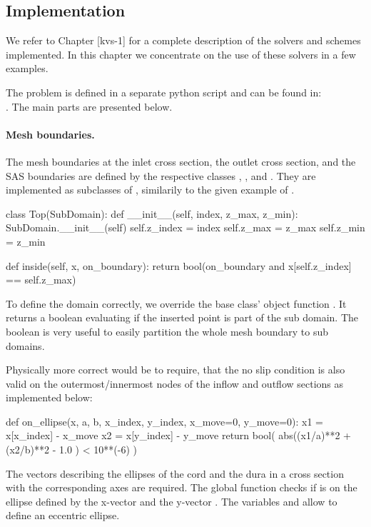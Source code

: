 \subsection{Implementation}
We refer to Chapter [kvs-1] for a complete description of the solvers
and schemes implemented. In this chapter we concentrate on the use of
these solvers in a few examples.  

The problem is defined in a separate python script and can be found in: \\
 . The main parts are presented below.

\paragraph{Mesh boundaries.}  The mesh boundaries at the inlet cross section, the outlet cross section, and the SAS boundaries are defined by the respective classes , , and . They are implemented as subclasses of , similarily to the given example of .
\begin{code}
class Top(SubDomain):	
	def __init__(self, index, z_max, z_min):
		SubDomain.__init__(self)
		self.z_index = index
		self.z_max = z_max
		self.z_min = z_min
	
	def inside(self, x, on_boundary):
		return bool(on_boundary and x[self.z_index] == self.z_max)
\end{code}
To define the domain correctly, we override the base class' object function . It returns a boolean evaluating if the inserted point  is part of the sub domain. The boolean  is very useful to easily partition the whole mesh boundary to sub domains. 

Physically more correct would be to require, that the no slip condition is also valid on the outermost/innermost nodes of the inflow and outflow sections as implemented below:
\begin{code}
def on_ellipse(x, a, b, x_index, y_index, x_move=0, y_move=0):
	x1 = x[x_index] - x_move
	x2 = x[y_index] - y_move
	return bool( abs((x1/a)**2 + (x2/b)**2 - 1.0 ) < 10**(-6) )
\end{code}
The vectors describing the ellipses of the cord and the dura in a cross section with the corresponding axes are required. The global function  checks if  is on the ellipse defined by the x-vector  and the y-vector . The variables  and  allow to define an eccentric ellipse. 

